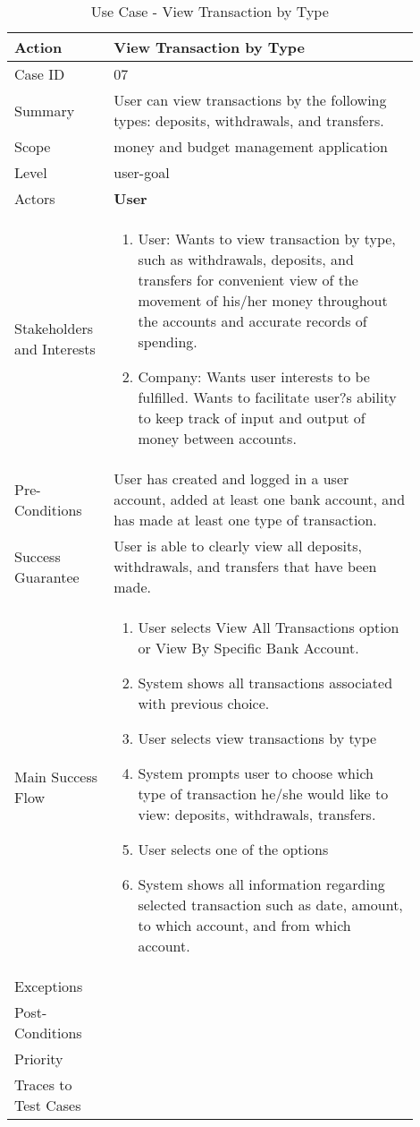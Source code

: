 \documentclass[11pt]{article}
\newcounter{use case ID}
\newcommand\tabularhead[1]{
\begin{table}[ht]
    \addtocounter{use case ID}{1}
    \caption{Use Case \arabic{use case ID} - #1}
    \vspace{0.2cm}
    \begin{tabular}{|p{0.2\linewidth}|p{0.70\linewidth}|}
    \hline
        \textbf{Action} & \textbf{#1} \\
        \hline}
\newcommand\addrow[2]{#1 & #2\\ \hline}
\newcommand\addmulrow[2]{ \begin{minipage}[t][][t]{2.5cm}#1\end{minipage}
        &\begin{minipage}[t][][t]{11cm}
        \begin{enumerate}[itemsep=-1ex] #2   \end{enumerate}
    \end{minipage}\vfill\\ \hline}
\newenvironment{usecase}{\tabularhead}
{\hline\end{tabular}\end{table}}
\begin{document}
\begin{usecase}{View Transaction by Type}
    \addrow{Case ID}{07}
    \addrow{Summary}{User can view transactions by the following types: deposits, withdrawals, and transfers. }
    \addrow{Scope}{money and budget management application}
    \addrow{Level}{user-goal}
    \addrow{Actors}{\textbf{User}}
    \addmulrow{Stakeholders and Interests}{
        \item User: Wants to view transaction by type, such as withdrawals, deposits, and transfers for convenient view of the movement of his/her money throughout the accounts and accurate records of spending.
        \item Company: Wants user interests to be fulfilled. Wants to facilitate user?s ability to keep track of input and output of money between accounts.}
    \addrow{Pre-Conditions}{User has created and logged in a user account, added at least one bank account, and has made at least one type of transaction.}
    \addrow{Success Guarantee}{User is able to clearly view all deposits, withdrawals, and transfers that have been made.}
    \addmulrow{Main Success Flow}{
        \item User selects View All Transactions option or View By Specific Bank Account.
        \item System shows all transactions associated with previous choice.
        \item User selects view transactions by type
        \item System prompts user to choose which type of transaction he/she would like to view: deposits, withdrawals, transfers.
        \item User selects one of the options
        \item System shows all information regarding selected transaction such as date, amount, to which account, and from which account.}
    \addrow{Exceptions}{}
    \addrow{Post-Conditions}{}
    \addrow{Priority}{}
    \addrow{Traces to Test Cases}{}
\end{usecase}
\end{document}
